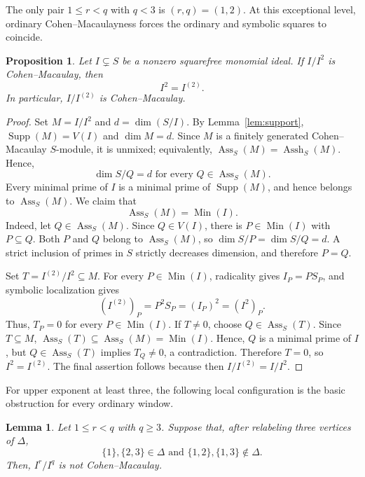 \documentclass[10pt,a4paper]{amsart}
\newtheorem{proposition}[theorem]{Proposition}
\newtheorem{lemma}[theorem]{Lemma}
\begin{document}
The only pair $1\le r<q$ with $q<3$ is $(r,q)=(1,2)$. At this exceptional
level, ordinary Cohen--Macaulayness forces the ordinary and symbolic squares
to coincide.

\begin{proposition}\label{prop:second-symbolic}
Let $I\subsetneq S$ be a nonzero squarefree monomial ideal. If $I/I^2$ is
Cohen--Macaulay, then
$$
I^2=I^{(2)}.
$$
In particular, $I/I^{(2)}$ is Cohen--Macaulay.
\end{proposition}

\begin{proof}
Set $M=I/I^2$ and $d=\dim(S/I)$. By Lemma~\ref{lem:support},
$\operatorname{Supp}(M)=V(I)$ and $\dim M=d$. Since $M$ is a finitely
generated Cohen--Macaulay $S$-module, it is unmixed; equivalently,
$\operatorname{Ass}_S(M)=\operatorname{Assh}_S(M)$. Hence,
$$
\dim S/Q=d\text{ for every }Q\in\operatorname{Ass}_S(M).
$$
Every minimal prime of $I$ is a minimal prime of $\operatorname{Supp}(M)$,
and hence belongs to $\operatorname{Ass}_S(M)$. We claim that
$$
\operatorname{Ass}_S(M)=\operatorname{Min}(I).
$$
Indeed, let $Q\in\operatorname{Ass}_S(M)$. Since $Q\in V(I)$, there is
$P\in\operatorname{Min}(I)$ with $P\subseteq Q$. Both $P$ and $Q$ belong
to $\operatorname{Ass}_S(M)$, so $\dim S/P=\dim S/Q=d$. A strict
inclusion of primes in $S$ strictly decreases dimension, and therefore $P=Q$.

Set $T=I^{(2)}/I^2\subseteq M$. For every $P\in\operatorname{Min}(I)$,
radicality gives $I_P=PS_P$, and symbolic localization gives
$$
(I^{(2)})_P=P^2S_P=(I_P)^2=(I^2)_P.
$$
Thus, $T_P=0$ for every $P\in\operatorname{Min}(I)$. If $T\neq0$, choose
$Q\in\operatorname{Ass}_S(T)$. Since $T\subseteq M$,
$\operatorname{Ass}_S(T)\subseteq\operatorname{Ass}_S(M)=\operatorname{Min}(I)$.
Hence, $Q$ is a minimal prime of $I$, but $Q\in\operatorname{Ass}_S(T)$
implies $T_Q\neq0$, a contradiction. Therefore $T=0$, so
$I^2=I^{(2)}$. The final assertion follows because then
$I/I^{(2)}=I/I^2$.
\end{proof}

For upper exponent at least three, the following local configuration is the
basic obstruction for every ordinary window.

\begin{lemma}\label{lem:three-vertex-obstruction}
Let $1\le r<q$ with $q\ge3$. Suppose that, after relabeling three vertices
of $\Delta$,
$$
\{1\},\{2,3\}\in\Delta
\text{ and }
\{1,2\},\{1,3\}\notin\Delta.
$$
Then, $I^r/I^q$ is not Cohen--Macaulay.
\end{lemma}
\end{document}
